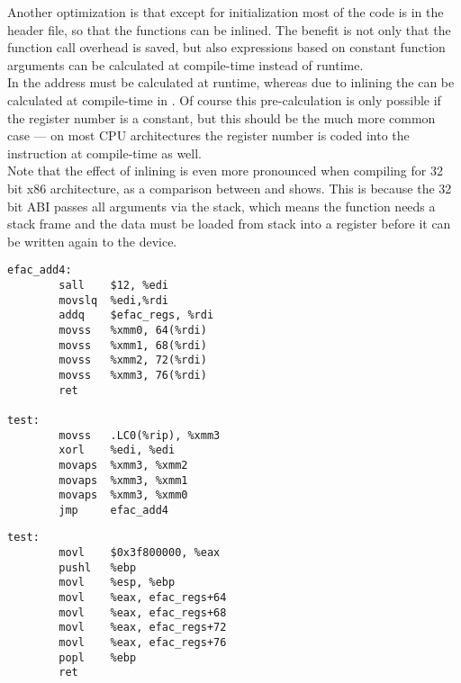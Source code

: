 Another optimization is that except for initialization most of the code is
in the header file, so that the functions can be inlined. The benefit is
not only that the function call overhead is saved, but also expressions
based on constant function arguments can be calculated at compile-time
instead of runtime.\\
In  the address must be calculated at runtime,
whereas due to inlining the can be calculated at compile-time in
. Of course this pre-calculation is only possible
if the register number is a constant, but this should be the much
more common case --- on most CPU architectures the register number
is coded into the instruction at compile-time as well.\\
Note that the effect of inlining is even more pronounced when compiling
for 32 bit x86 architecture, as a comparison between 
and  shows. This is because the 32 bit ABI passes
all arguments via the stack, which means the function needs a stack
frame and the data must be loaded from stack into a register before
it can be written again to the device.\\


\begin{lstlisting}[float=ht,caption={x86\_64 not inlined (gcc -S -m64 -O3 -fno-inline)},label={lst:noinline64}]
efac_add4:
        sall    $12, %edi
        movslq  %edi,%rdi
        addq    $efac_regs, %rdi
        movss   %xmm0, 64(%rdi)
        movss   %xmm1, 68(%rdi)
        movss   %xmm2, 72(%rdi)
        movss   %xmm3, 76(%rdi)
        ret

test:
        movss   .LC0(%rip), %xmm3
        xorl    %edi, %edi
        movaps  %xmm3, %xmm2
        movaps  %xmm3, %xmm1
        movaps  %xmm3, %xmm0
        jmp     efac_add4
\end{lstlisting}

\begin{lstlisting}[float=ht,caption={x86 inlined (gcc -S -m32 -O3)},label={lst:inline32}]
test:
        movl    $0x3f800000, %eax
        pushl   %ebp
        movl    %esp, %ebp
        movl    %eax, efac_regs+64
        movl    %eax, efac_regs+68
        movl    %eax, efac_regs+72
        movl    %eax, efac_regs+76
        popl    %ebp
        ret
\end{lstlisting}

